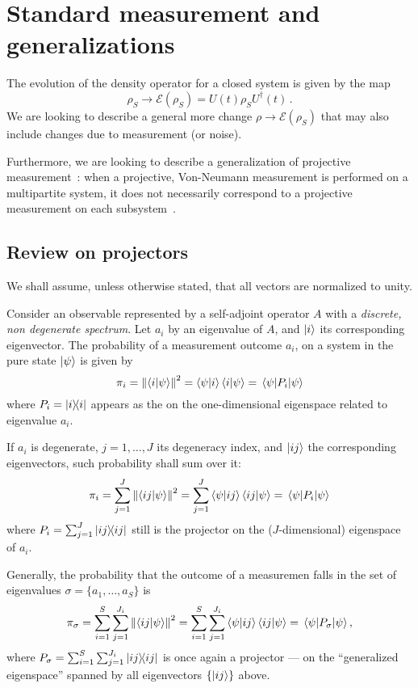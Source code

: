 \section{Standard measurement and generalizations}

The evolution of the density operator for a closed system is given by the map
\[
    \rho_{S} \rightarrow \mathcal{E}(\rho_{S}) = U(t)\rho_{S}U^{\dagger}(t) \, \text{.}
\] 
We are looking to describe a general more change
$\rho \rightarrow \mathcal{E}(\rho_{S})$ that may also include
changes due to measurement (or noise).

Furthermore, we are looking to describe a generalization
of projective measurement~\parencite{VonNeumann}:
when a projective, Von-Neumann
measurement is performed on a multipartite system,
it does not necessarily correspond to a projective measurement
on each subsystem~\parencite[Ch. 3]{PreskillNotes}.

\subsection{Review on projectors}

We shall assume, unless otherwise stated, that all vectors are
normalized to unity.

Consider an observable represented by a self-adjoint operator $A$
with a 
\emph{discrete, non degenerate spectrum}.
Let $a_i$ by an eigenvalue of $A$, and $\ket{i}$ its corresponding eigenvector.
The probability of a measurement
outcome $a_i$,
on a system in the pure state $\ket{\psi}$
is given by
$$
\pi_{i} = \norm{\braket{i}{\psi}}^2
        = \bra{\psi}\ket{i}\bra{i}\ket{\psi}
        = \mel{\psi}{P_{i}}{\psi}
$$
where $P_{i} = \ketbra{i}$ appears as the  on the
one-dimensional ei\-gen\-space related to eigenvalue  $a_i$.

If $a_i$ is degenerate, $j = 1, \dots, J$ its degeneracy index, and $\ket{ij}$ the corresponding eigenvectors,
such probability shall sum over it:
$$
\pi_{i} = \sum_{j=1}^{J}\norm{\braket{ij}{\psi}}^2
        = \sum_{j=1}^{J}\bra{\psi}\ket{ij}\bra{ij}\ket{\psi}
        = \mel{\psi}{P_{i}}{\psi}
$$
where $P_{i} = \sum_{j=1}^{J}\ketbra{ij}$
still is the projector on the
($J$-dimensional) eigenspace of $a_i$.

Generally, the probability that the outcome of a measuremen falls in
the set of eigenvalues $\sigma = \{a_{1}, \dots, a_{S}\}$ is
\begin{equation}\label{eq:pi_sigma}
\pi_{\sigma}  = \sum_{i=1}^{S}\sum_{j=1}^{J_{i}}\norm{\braket{ij}{\psi}}^2
              = \sum_{i=1}^{S}\sum_{j=1}^{J_{i}}\bra{\psi}\ket{ij}\bra{ij}\ket{\psi}
              = \mel{\psi}{P_{\sigma}}{\psi}
              ,
\end{equation}
where $P_{\sigma} = \sum_{i=1}^{S}\sum_{j=1}^{J_{i}}\ketbra{ij}$
is once again a projector --- on the ``generalized eigenspace'' spanned by all
eigenvectors $\{\ket{ij}\}$ above.

